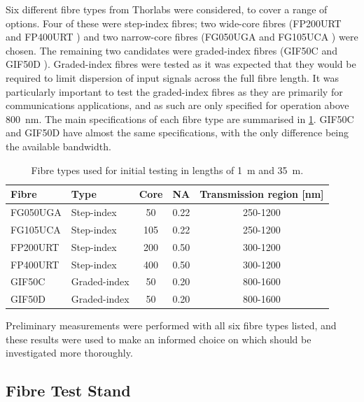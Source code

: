 \documentclass[a4paper,11pt]{article}
\begin{document}
Six different fibre types from Thorlabs were considered, to cover a range of options. Four of these were step-index fibres; two wide-core fibres (FP200URT \cite{bib:fp200urt} and FP400URT \cite{bib:fp400urt}) and two narrow-core fibres (FG050UGA \cite{bib:fg050uga} and FG105UCA \cite{bib:fg105uca}) were chosen. The remaining two candidates were graded-index fibres (GIF50C \cite{bib:gif50c} and GIF50D \cite{bib:gif50d}). Graded-index fibres were tested as it was expected that they would be required to limit dispersion of input signals across the full fibre length. It was particularly important to test the graded-index fibres as they are primarily for communications applications, and as such are only specified for operation above 800~nm. The main specifications of each fibre type are summarised in \cref{tab:fibres}. GIF50C and GIF50D have almost the same specifications, with the only difference being the available bandwidth.
\begin{table}[h]
\centering
\begin{tabular}{llccc}
\toprule
Fibre	   & Type   		  & Core \diameter [$\mu$m] &  NA 	  &  Transmission region [nm]\\ \midrule
FG050UGA   &  Step-index      &           \phantom{0}50  			&  0.22   &   250-1200       \\
FG105UCA   &  Step-index      &           105  			&  0.22   &   250-1200       \\
FP200URT   &  Step-index      &           200  			&  0.50   &   300-1200       \\
FP400URT   &  Step-index      &           400  			&  0.50   &   300-1200      \\
GIF50C     &  Graded-index    &           \phantom{0}50  			&  0.20	  &   800-1600       \\
GIF50D     &  Graded-index    &           \phantom{0}50 			&  0.20   &   800-1600      \\ \bottomrule
\end{tabular}
\caption{Fibre types used for initial testing in lengths of 1~m and 35~m.}\label{tab:fibres}
\end{table}
Preliminary measurements were performed with all six fibre types listed, and these results were used to make an informed choice on which should be investigated more thoroughly.


\subsection{Fibre Test Stand}\label{sec:meas:sub:stand}
\end{document}
